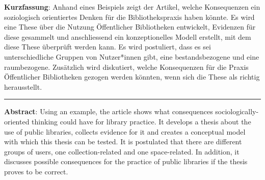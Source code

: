 \textbf{Kurzfassung}: Anhand eines Beispiels zeigt der Artikel, welche
Konsequenzen ein soziologisch orientiertes Denken für die
Bibliothekspraxis haben könnte. Es wird eine These über die Nutzung
Öffentlicher Bibliotheken entwickelt, Evidenzen für diese gesammelt und
anschliessend ein konzeptionelles Modell erstellt, mit dem diese These
überprüft werden kann. Es wird postuliert, dass es sei unterschiedliche
Gruppen von Nutzer*innen gibt, eine bestandsbezogene und eine
raumbezogene. Zusätzlich wird diskutiert, welche Konsequenzen für die
Praxis Öffentlicher Bibliotheken gezogen werden könnten, wenn sich die
These als richtig herausstellt.

\begin{center}\rule{0.5\linewidth}{0.5pt}\end{center}

\textbf{Abstract}: Using an example, the article shows what consequences
sociologically-oriented thinking could have for library practice. It
develops a thesis about the use of public libraries, collects evidence
for it and creates a conceptual model with which this thesis can be
tested. It is postulated that there are different groups of users, one
collection-related and one space-related. In addition, it discusses
possible consequences for the practice of public libraries if the thesis
proves to be correct.
